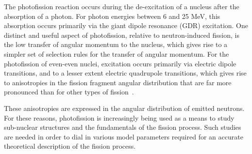 \label{sec:level1}
The photofission reaction occurs during the de-excitation of a nucleus after the absorption of a photon.
For photon energies between 6 and 25 MeV, this absorption occurs primarily via the giant dipole resonance (GDR) excitation.
One distinct and useful aspect of photofission, relative to neutron-induced fission, is the low transfer of angular momentum to the nucleus, which gives rise to a simpler set of selection rules for the transfer of angular momentum.
For the photofission of even-even nuclei, excitation occurs primarily via electric dipole transitions, and to a lesser extent electric quadrupole transitions, which gives rise to anisotropies in the fission fragment angular distribution that are far more pronounced than for other types of fission~\cite{1977FragAss}.

These anisotropies are expressed in the angular distribution of emitted neutrons.
For these reasons, photofission is increasingly being used as a means to study sub-nuclear structures and the fundamentals of the fission process.
Such studies are needed in order to dial in various model parameters required for an accurate theoretical description of the fission process.